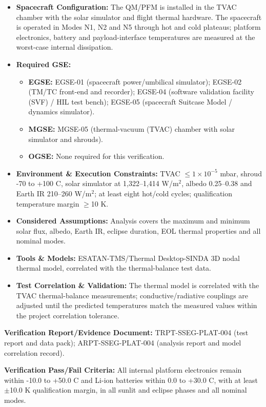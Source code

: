 \begin{itemize}
\item \textbf{Spacecraft Configuration:} The QM/PFM is installed in the TVAC chamber with the solar simulator and flight thermal hardware. The spacecraft is operated in Modes N1, N2 and N5 through hot and cold plateaus; platform electronics, battery and payload-interface temperatures are measured at the worst-case internal dissipation.
\item \textbf{Required GSE:}
\begin{itemize}
\item \textbf{EGSE:} EGSE-01 (spacecraft power/umbilical simulator); EGSE-02 (TM/TC front-end and recorder); EGSE-04 (software validation facility (SVF) / HIL test bench); EGSE-05 (spacecraft Suitcase Model / dynamics simulator).
\item \textbf{MGSE:} MGSE-05 (thermal-vacuum (TVAC) chamber with solar simulator and shrouds).
\item \textbf{OGSE:} None required for this verification.
\end{itemize}
\item \textbf{Environment \& Execution Constraints:} TVAC $\le$$1\times10^{-5}$ mbar, shroud -70 to +100 C, solar simulator at 1,322--1,414 W/m$^2$, albedo 0.25--0.38 and Earth IR 210--260 W/m$^2$; at least eight hot/cold cycles; qualification temperature margin $\ge$10 K.
\item \textbf{Considered Assumptions:} Analysis covers the maximum and minimum solar flux, albedo, Earth IR, eclipse duration, EOL thermal properties and all nominal modes.
\item \textbf{Tools \& Models:} ESATAN-TMS/Thermal Desktop-SINDA 3D nodal thermal model, correlated with the thermal-balance test data.
\item \textbf{Test Correlation \& Validation:} The thermal model is correlated with the TVAC thermal-balance measurements; conductive/radiative couplings are adjusted until the predicted temperatures match the measured values within the project correlation tolerance.
\end{itemize}
\par\textbf{Verification Report/Evidence Document:} TRPT-SSEG-PLAT-004 (test report and data pack); ARPT-SSEG-PLAT-004 (analysis report and model correlation record).
\par\textbf{Verification Pass/Fail Criteria:} All internal platform electronics remain within -10.0 to +50.0 C and Li-ion batteries within 0.0 to +30.0 C, with at least $\pm$10.0 K qualification margin, in all sunlit and eclipse phases and all nominal modes.
\par\medskip
